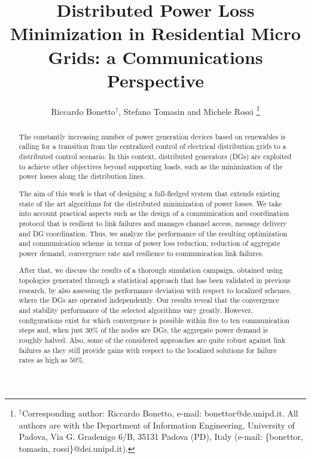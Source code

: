 \documentclass[journal]{IEEEtran}
\title{Distributed Power Loss Minimization in Residential Micro Grids: a Communications Perspective}
\author{Riccardo Bonetto$^\dag$, Stefano Tomasin and Michele Rossi
\thanks{$^\dag$Corresponding author: Riccardo Bonetto, e-mail: bonettor@de.unipd.it. All authors are with the Department of Information Engineering, University of Padova, Via G. Gradenigo 6/B, 35131 Padova (PD), Italy (e-mail: \{bonettor, tomasin, rossi\}@dei.unipd.it).}}
\begin{document}
\maketitle


\begin{abstract}
The constantly increasing number of power generation devices based on renewables is calling for a transition from the centralized control of electrical distribution grids to a distributed control scenario. In this context, distributed generators (DGs) are exploited to achieve other objectives beyond supporting loads, such as the minimization of the power losses along the distribution lines.

The aim of this work is that of designing a full-fledged system that extends existing state of the art algorithms for the distributed minimization of power losses. We take into account practical aspects such as the design of a communication and coordination protocol that is resilient to link failures and manages channel access, message delivery and DG coordination. Thus, we analyze the performance of the resulting optimization and communication scheme in terms of power loss reduction, reduction of aggregate power demand, convergence rate and resilience to communication link failures.

After that, we discuss the results of a thorough simulation campaign, obtained using topologies generated through a statistical approach that has been validated in previous research, by also assessing the performance deviation with respect to localized schemes, where the DGs are operated independently. Our results reveal that the convergence and stability performance of the selected algorithms vary greatly. However, configurations exist for which convergence is possible within five to ten communication steps and, when just $30$\% of the nodes are DGs, the aggregate power demand is roughly halved. Also, some of the considered approaches are quite robust against link failures as they still provide gains with respect to the localized solutions for failure rates as high as $50$\%.
\end{abstract}
\end{document}
